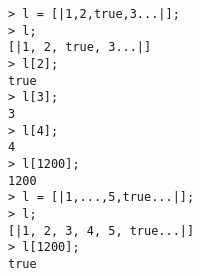 \begin{center}\begin{minipage}{15cm}\begin{Verbatim}[frame=single]
> l = [|1,2,true,3...|];
> l;
[|1, 2, true, 3...|]
> l[2];
true
> l[3];
3
> l[4];
4
> l[1200];
1200
> l = [|1,...,5,true...|];
> l;
[|1, 2, 3, 4, 5, true...|]
> l[1200];
true
\end{Verbatim}
\end{minipage}\end{center}
